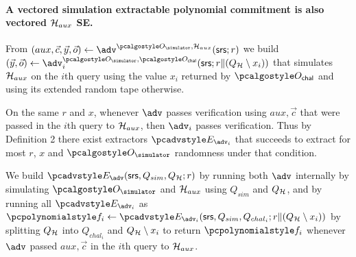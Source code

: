 \documentclass[runningheads,11pt]{llncs}
\let\spvec\vec \let\vec\accentvec
\let\vec\spvec
\begin{document}
\paragraph{A vectored simulation extractable polynomial commitment is also vectored $\mathcal{H}_{aux}$ SE.}
From $(aux, \vec{c}, \vec{y}, \vec{o}) \gets \adv^{\oracles,\ro_{aux}}(\srs; r)$ we build $(\vec{y},\vec{o}) \gets \adv_{i}^{\oracles,\oraclec}(\srs; r\|(Q_{\ro}\setminus x_{i}))$ that simulates $\mathcal{H}_{aux}$ on the $i$th query using the value $x_{i}$ returned by $\oraclec$ and using its extended random tape otherwise.

On the same $r$ and $x$, whenever $\adv$ passes verification using $aux,\vec{c}$ that were passed in the $i$th query to $\mathcal{H}_{aux}$, then $\adv_{i}$ passes verification.  Thus by Definition 2 there exist extractors $\Ext_{\adv_{i}}$ that succeeds to extract for most $r$, $x$ and $\oracles$ randomness under that condition.

We build $\Ext_{\adv}(\srs, Q_{sim}, Q_{\ro}; r)$ by running both $\adv$
internally by simulating $\oracles$ and $\mathcal{H}_{aux}$ using $Q_{sim}$ and
$Q_{\mathcal{H}}$, and by running all $\Ext_{\adv_{i}}$ as $\p{f}_{i}\gets
\Ext_{\adv_{i}}(\srs,Q_{sim},Q_{chal_{i}}; r\|(Q_{\ro}\setminus x_{i}))$ by
splitting $Q_{\mathcal{H}}$ into $Q_{chal_{i}}$ and $Q_{\mathcal{H}}\setminus x_{i}$ to return
$\p{f}_{i}$ whenever $\adv$ passed $aux,\vec{c}$ in the $i$th query to
$\mathcal{H}_{aux}$.

\end{document}
